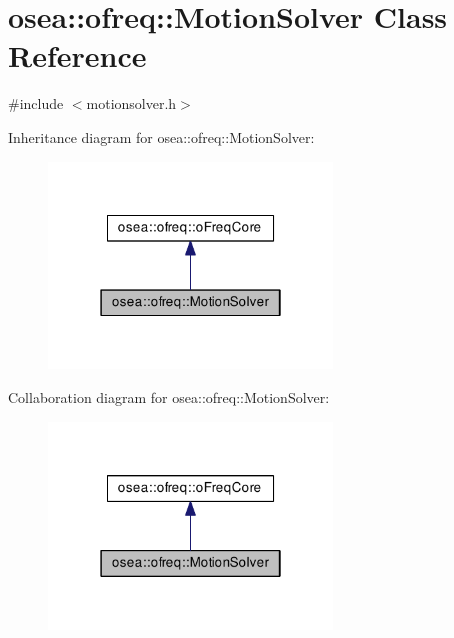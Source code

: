 \hypertarget{classosea_1_1ofreq_1_1_motion_solver}{\section{osea\-:\-:ofreq\-:\-:Motion\-Solver Class Reference}
\label{classosea_1_1ofreq_1_1_motion_solver}
}


{\ttfamily \#include $<$motionsolver.\-h$>$}



Inheritance diagram for osea\-:\-:ofreq\-:\-:Motion\-Solver\-:\nopagebreak
\begin{figure}[H]
\begin{center}
\leavevmode
\includegraphics[width=214pt]{classosea_1_1ofreq_1_1_motion_solver__inherit__graph}
\end{center}
\end{figure}


Collaboration diagram for osea\-:\-:ofreq\-:\-:Motion\-Solver\-:\nopagebreak
\begin{figure}[H]
\begin{center}
\leavevmode
\includegraphics[width=214pt]{classosea_1_1ofreq_1_1_motion_solver__coll__graph}
\end{center}
\end{figure}
